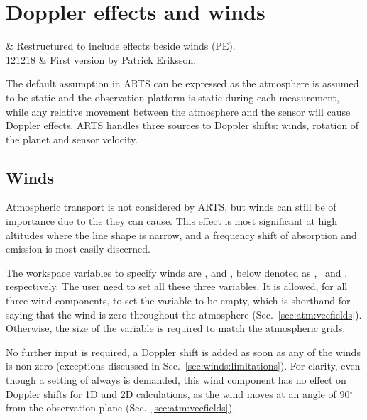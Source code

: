 \chapter{Doppler effects and winds}
 \label{sec:winds}


  & Restructured to include effects beside winds (PE).\\
 121218 & First version by Patrick Eriksson.\\
 \stophistory


 The default assumption in ARTS can be expressed as the atmosphere is assumed
 to be static and the observation platform is static during each measurement,
 while any relative movement between the atmosphere and the sensor will cause
 Doppler effects. ARTS handles three sources to Doppler
 shifts: winds, rotation of the planet and sensor velocity.


\section{Winds}
\label{sec:winds:defs}

Atmospheric transport is not considered by ARTS, but winds can still be of
importance due to the  they can cause. This effect is
most significant at high altitudes where the line shape is narrow, and a
frequency shift of absorption and emission is most easily discerned.

The workspace variables to specify winds are ,
 and , below denoted as
\WindWE, \WindSN\ and \WindVe, respectively. The user need to set all these
three variables. It is allowed, for all three wind components, to set the
variable to be empty, which is shorthand for saying that the wind is zero
throughout the atmosphere (Sec.~\ref{sec:atm:vecfields}). Otherwise, the size
of the variable is required to match the atmospheric grids.

No further input is required, a Doppler shift is added as soon as any of the
winds is non-zero (exceptions discussed in
Sec.~\ref{sec:winds:limitations}). For clarity, even though a setting of
 always is demanded, this wind component has no
effect on Doppler shifts for 1D and 2D calculations, as the wind moves at an
angle of 90$^\circ$ from the observation plane (Sec.~\ref{sec:atm:vecfields}).


